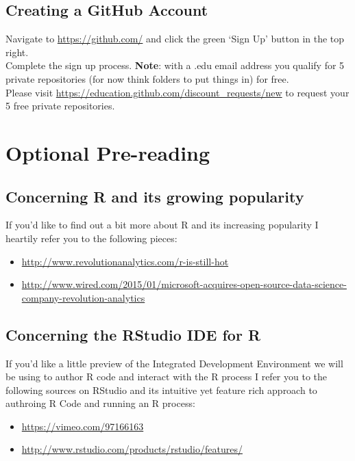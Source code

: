 \documentclass{article}[12pt]
\begin{document}
\subsection*{Creating a GitHub Account}
Navigate to \url{https://github.com/} and click the green `Sign Up' button in the top right.\\
Complete the sign up process.
\newline
\newline
\textbf{Note}: with a .edu email address you qualify for 5 private repositories (for now think folders to put things in) for free.\\
Please visit \url{https://education.github.com/discount_requests/new} to request your 5 free private repositories.

\section*{Optional Pre-reading}
\subsection*{Concerning R and its growing popularity}
If you'd like to find out a bit more about R and its increasing popularity I heartily refer you to the following pieces: \begin{itemize}
\item \url{http://www.revolutionanalytics.com/r-is-still-hot}
\item \href{http://www.wired.com/2015/01/microsoft-acquires-open-source-data-science-company-revolution-analytics}{http://www.wired.com/2015/01/microsoft-acquires-open-source-data-science-company-revolution-analytics}
\end{itemize}

\subsection*{Concerning the RStudio IDE for R}
If you'd like a little preview of the Integrated Development Environment we will be using to author R code and interact with the R process I refer you to the following sources on RStudio and its intuitive yet feature rich approach to authroing R Code and running an R process: \begin{itemize}
\item \url{https://vimeo.com/97166163}
\item \url{http://www.rstudio.com/products/rstudio/features/}
\end{itemize}
\end{document}
